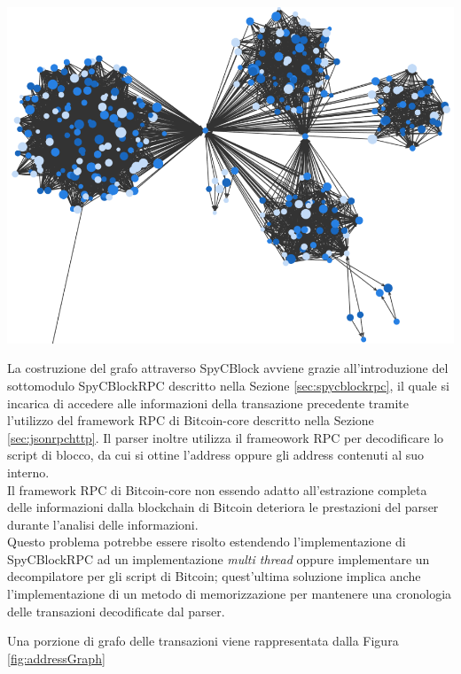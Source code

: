  {\centering
 \includegraphics[scale=0.35]{images/demo/iterationTx.png}
 \par}

 La costruzione del grafo attraverso SpyCBlock avviene grazie all'introduzione del sottomodulo SpyCBlockRPC descritto nella Sezione \ref{sec:spycblockrpc}, il quale si incarica di accedere alle informazioni della transazione precedente tramite l'utilizzo del framework RPC di Bitcoin-core descritto nella Sezione \ref{sec:jsonrpchttp}.
 Il parser inoltre utilizza il frameowork RPC per decodificare lo script di blocco, da cui si ottine l'address oppure gli address contenuti al suo interno.\\
 Il framework RPC di Bitcoin-core non essendo adatto all'estrazione completa delle informazioni dalla blockchain di Bitcoin deteriora le prestazioni del parser durante l'analisi delle informazioni.\\
 Questo problema potrebbe essere risolto estendendo l'implementazione di SpyCBlockRPC ad un implementazione \emph{multi thread} oppure implementare un decompilatore per gli script di Bitcoin; quest'ultima soluzione implica anche l'implementazione di un metodo di memorizzazione per mantenere una cronologia delle transazioni decodificate dal parser.

 Una porzione di grafo delle transazioni viene rappresentata dalla Figura \ref{fig:addressGraph}

